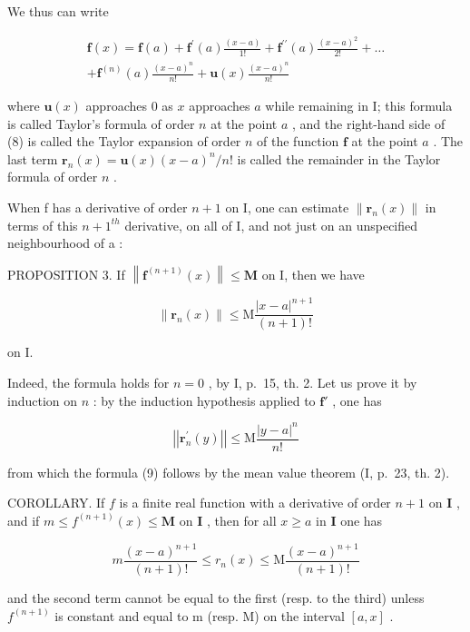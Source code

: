 We thus can write

\[
\begin{array}{c} \mathbf {f} (x) = \mathbf {f} (a) + \mathbf {f} ^ {\prime} (a) \frac {(x - a)}{1 !} + \mathbf {f} ^ {\prime \prime} (a) \frac {(x - a) ^ {2}}{2 !} + \dots \\ + \mathbf {f} ^ {(n)} (a) \frac {(x - a) ^ {n}}{n !} + \mathbf {u} (x) \frac {(x - a) ^ {n}}{n !} \end{array}\tag{8}
\]

where \(\mathbf{u}(x)\) approaches 0 as \(x\) approaches \(a\) while remaining in I; this formula is called Taylor's formula of order \(n\) at the point \(a\) , and the right-hand side of (8) is called the Taylor expansion of order \(n\) of the function \(\mathbf{f}\) at the point \(a\) . The last term \(\mathbf{r}_n(x) = \mathbf{u}(x)(x - a)^n / n!\) is called the remainder in the Taylor formula of order \(n\) .

When f has a derivative of order \(n + 1\) on I, one can estimate \(\|\mathbf{r}_{n}(x)\|\) in terms of this \(n + 1^{th}\) derivative, on all of I, and not just on an unspecified neighbourhood of a :

PROPOSITION 3. If \(\left\| \mathbf{f}^{(n + 1)}(x)\right\| \leqslant \mathbf{M}\) on I, then we have

\[
\| \mathbf {r} _ {n} (x) \| \leqslant \mathrm{M} \frac {| x - a | ^ {n + 1}}{(n + 1) !}\tag{9}
\]

on I.

Indeed, the formula holds for \(n = 0\) , by I, p.~15, th. 2. Let us prove it by induction on \(n\) : by the induction hypothesis applied to \(\mathbf{f}'\) , one has

\[
\left| \left| \mathbf {r} _ {n} ^ {\prime} (y) \right| \right| \leqslant \mathrm{M} \frac {| y - a | ^ {n}}{n !}
\]

from which the formula (9) follows by the mean value theorem (I, p.~23, th. 2).

COROLLARY. If \(f\) is a finite real function with a derivative of order \(n + 1\) on \(\mathbf{I}\) , and if \(m \leqslant f^{(n + 1)}(x) \leqslant \mathbf{M}\) on \(\mathbf{I}\) , then for all \(x \geqslant a\) in \(\mathbf{I}\) one has

\[
m \frac {(x - a) ^ {n + 1}}{(n + 1) !} \leqslant r _ {n} (x) \leqslant \mathrm{M} \frac {(x - a) ^ {n + 1}}{(n + 1) !}\tag{10}
\]

and the second term cannot be equal to the first (resp. to the third) unless \(f^{(n+1)}\) is constant and equal to m (resp. M) on the interval \([a, x]\) .


